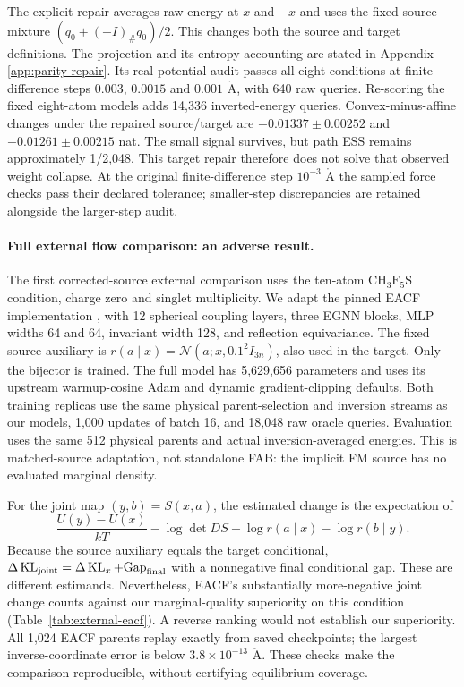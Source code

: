The explicit repair averages raw energy at $x$ and $-x$ and uses the fixed source mixture
$(q_0+(-I)_\#q_0)/2$. This changes both the source and target definitions.
The projection and its entropy accounting are stated in
Appendix \ref{app:parity-repair}. Its real-potential audit passes all eight
conditions at finite-difference steps $0.003$, $0.0015$ and $0.001$
$\mathrm{\mathring A}$, with 640 raw queries. Re-scoring the fixed eight-atom
models adds 14,336 inverted-energy queries. Convex-minus-affine changes under
the repaired source/target are $-0.01337\pm0.00252$ and $-0.01261\pm0.00215$
nat. The small signal survives, but path ESS remains approximately 1/2,048.
This target repair therefore does not solve that observed weight collapse.
At the original finite-difference step $10^{-3}$
$\mathrm{\mathring A}$ the sampled force checks pass their declared tolerance;
smaller-step discrepancies are retained alongside the larger-step audit.

\paragraph{Full external flow comparison: an adverse result.}
The first corrected-source external comparison uses the ten-atom
$\mathrm{CH_3F_5S}$ condition, charge zero and singlet multiplicity. We adapt
the pinned EACF implementation \citep{midgley2023eacf}, with 12 spherical
coupling layers, three EGNN blocks, MLP widths 64 and 64, invariant width 128,
and reflection equivariance. The fixed source auxiliary is
$r(a\mid x)=\mathcal N(a;x,0.1^2 I_{3n})$, also used in the target.
Only the bijector is trained. The full model has 5,629,656 parameters and uses
its upstream warmup-cosine Adam and dynamic gradient-clipping defaults.
Both training replicas use the same physical parent-selection and inversion
streams as our models, 1,000 updates of batch 16, and 18,048 raw oracle queries.
Evaluation uses the same 512 physical parents and actual inversion-averaged
energies. This is matched-source adaptation, not standalone FAB: the implicit
FM source has no evaluated marginal density.

For the joint map $(y,b)=S(x,a)$, the estimated change is the expectation of
\[
 \frac{U(y)-U(x)}{kT}-\log\det DS
 +\log r(a\mid x)-\log r(b\mid y).
\]
Because the source auxiliary equals the target conditional,
$\Delta\operatorname{KL}_{\mathrm{joint}}=\Delta\operatorname{KL}_x+\mathrm{Gap}_{\mathrm{final}}$
with a nonnegative final conditional gap. These are different estimands.
Nevertheless, EACF's substantially more-negative joint change counts against
our marginal-quality superiority on this condition
(Table~\ref{tab:external-eacf}). A reverse ranking would not establish our
superiority. All 1,024 EACF parents replay exactly from saved checkpoints;
the largest inverse-coordinate error is below $3.8\times10^{-13}$
$\mathrm{\mathring A}$. These checks make the comparison reproducible,
without certifying equilibrium coverage.

